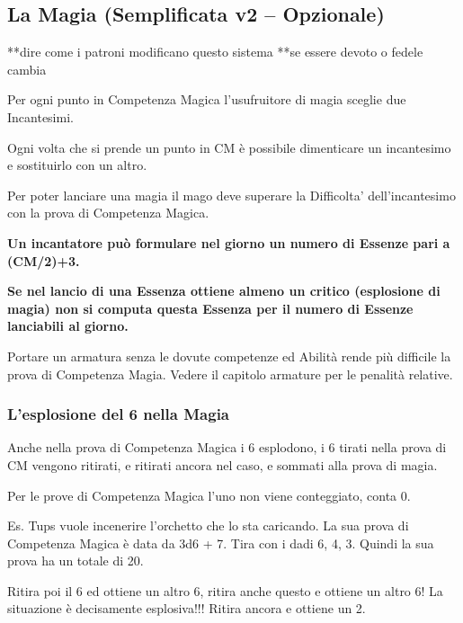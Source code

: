 \subsection{La Magia (Semplificata v2 -- Opzionale)}

\begin{multicols}{2}

**dire come i patroni modificano questo sistema
**se essere devoto o fedele cambia
	
Per ogni punto in Competenza Magica l'usufruitore di magia sceglie due Incantesimi.

Ogni volta che si prende un punto in CM è possibile dimenticare un incantesimo e sostituirlo con un altro.

Per poter lanciare una magia il mago deve superare la Difficolta' dell'incantesimo con la prova di Competenza Magica.

\textbf{Un incantatore può formulare nel giorno un numero di Essenze pari a (CM/2)+3.} 

\textbf{Se nel lancio di una Essenza ottiene almeno un critico (esplosione di magia) non si computa questa Essenza per il numero di Essenze lanciabili al giorno.}

Portare un armatura senza le dovute competenze ed Abilità rende più difficile la prova di Competenza Magia. Vedere il capitolo armature per le penalità relative.

\subsubsection{L'esplosione del 6 nella Magia}

\label{lesplosione-del-6-nella-magia}

Anche nella prova di Competenza Magica i 6 esplodono, i 6 tirati nella prova di CM vengono ritirati, e ritirati ancora nel caso, e sommati alla prova di magia.

Per le prove di Competenza Magica l'uno non viene conteggiato, conta 0.

Es. Tups vuole incenerire l'orchetto che lo sta caricando. La sua prova di Competenza Magica è data da 3d6 + 7. Tira con i dadi 6, 4, 3. Quindi la sua prova ha un totale di 20.

Ritira poi il 6 ed ottiene un altro 6, ritira anche questo e ottiene un altro 6! La situazione è decisamente esplosiva!!! Ritira ancora e ottiene un 2.




\end{multicols}
